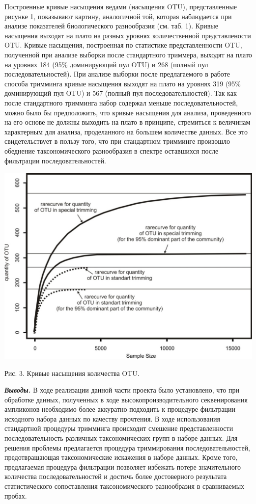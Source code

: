 \documentclass[a4paper,12pt,openany,final]{extreport}
\begin{document}
Построенные кривые насыщения ведами (насыщения OTU), представленные
рисунке 1, показывают картину, аналогичной той, которая наблюдается при
анализе показателей биологического разнообразия (см. таб. 1). Кривые
насыщения выходят на плато на разных уровнях количественной
представлености OTU. Кривые насыщения, построенная по статистике
представленности OTU, полученной при анализе выборки после стандартного
триммера, выходят на плато на уровнях 184 (95\% доминирующий пул OTU) и
268 (полный пул последовательностей). При анализе выборки после
предлагаемого в работе способа тримминга кривые насыщения выходят на
плато на уровнях 319 (95\% доминирующий пул OTU) и 567 (полный пул
последовательностей). Так как после стандартного тримминга набор
содержал меньше последовательностей, можно было бы предположить, что
кривые насыщения для анализа, проведенного на его основе не должны
выходить на плато в принципе, стремиться к величинам характерным для
анализа, проделанного на большем количестве данных. Все это
свидетельствует в пользу того, что при стандартном тримминге произошло
обеднение таксономического разнообразия в спектре оставшихся после
фильтрации последовательностей.

\includegraphics[width=5.30208in,height=3.97708in]{media/image7.jpeg}

Рис. 3. Кривые насыщения количества OTU.

\emph{\textbf{Выводы.}} В ходе реализации данной части проекта было
установлено, что при обработке данных, полученных в ходе
высокопроизводительного секвенирования ампликонов необходимо более
аккуратно подходить к процедуре фильтрации исходного набора данных по
качеству прочтения. В ходе использования стандартной процедуры тримминга
происходит смешение представленности последовательность различных
таксономических групп в наборе данных. Для решения проблемы предлагается
процедура триммирования последовательностей, предотвращающая
таксономические искажения в наборе данных. Кроме того, предлагаемая
процедура фильтрации позволяет избежать потере значительного количества
последовательностей и достичь более достоверного результата
статистического сопоставления таксономического разнообразия в
сравниваемых пробах.
\end{document}
